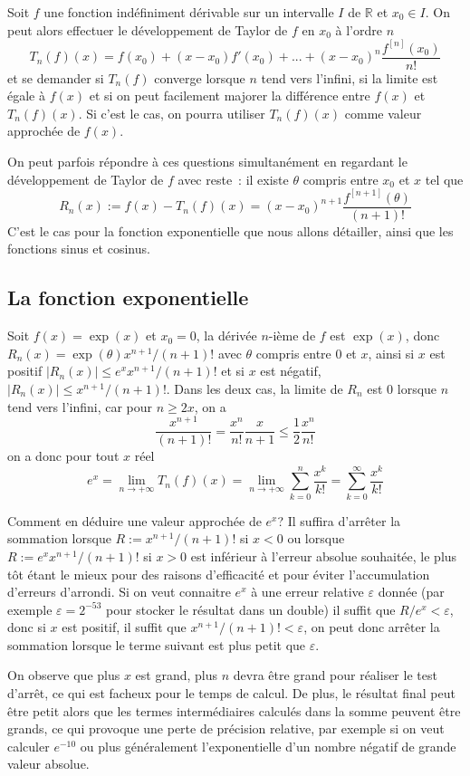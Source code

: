 \documentclass[a4paper,11pt]{article}
\newcommand{\R}{{\mathbb{R}}}
\begin{document}
\begin{giacjshere}
Soit $f$ une fonction indéfiniment dérivable sur un intervalle $I$ de $\R$
et $x_0 \in I$. On peut alors effectuer le développement de Taylor de $f$
en $x_0$ à l'ordre $n$
\[ T_n(f)(x)= f(x_0) + (x-x_0) f'(x_0) + ... + 
(x-x_0)^n \frac{f^{[n]}(x_0)}{n!} \]
et se demander si $T_n(f)$ converge lorsque $n$ tend vers
l'infini, si la limite est égale à $f(x)$ et si on peut facilement
majorer la différence entre $f(x)$ et $T_n(f)(x)$. Si c'est le
cas, on pourra utiliser $T_n(f)(x)$ comme valeur approchée de $f(x)$.

On peut parfois répondre à ces questions simultanément en regardant le
développement de Taylor de $f$ avec reste~: il existe $\theta$ compris
entre $x_0$ et $x$ tel que
\[ R_n(x) := f(x)- T_n(f)(x) = (x-x_0)^{n+1}\frac{f^{[n+1]}(\theta)}{(n+1)!} \]
C'est le cas pour la fonction exponentielle que nous allons
détailler, ainsi que les fonctions sinus et cosinus.

\subsection{La fonction exponentielle}
Soit $f(x)=\exp(x)$ et $x_0=0$, la dérivée $n$-ième de $f$ 
est $\exp(x)$, donc $R_n(x)=\exp(\theta)x^{n+1}/(n+1)!$ avec $\theta$
compris entre 0 et $x$, ainsi si $x$ est positif 
$|R_n(x)| \leq e^x x^{n+1}/(n+1)!$ et si $x$ est négatif,
$|R_n(x)| \leq x^{n+1}/(n+1)!$. Dans les deux cas, la limite de $R_n$
est 0 lorsque $n$ tend vers l'infini, car pour $n \geq 2x$, on a
\[ \frac{x^{n+1}}{(n+1)!} = \frac{x^n}{n!} \frac{x}{n+1}\leq 
\frac{1}{2}\frac{x^n}{n!}\]
on a donc pour tout $x$ réel
\[ e^x = \lim_{n \rightarrow +\infty} T_n(f)(x)
= \lim_{n \rightarrow +\infty} \sum_{k=0}^n \frac{x^k}{k!}
= \sum_{k=0}^\infty \frac{x^k}{k!} \]

Comment en déduire une valeur approchée de $e^x$? Il suffira d'arr\^eter
la sommation lorsque $R:=x^{n+1}/(n+1)!$ si $x<0$ ou lorsque
$R:=e^x x^{n+1}/(n+1)!$ si $x>0$ est inférieur à 
l'erreur absolue souhaitée, le plus tôt étant le mieux pour des
raisons d'efficacité et pour éviter l'accumulation d'erreurs
d'arrondi. 
Si on veut connaitre $e^x$ à une erreur relative $\varepsilon$ donnée
(par exemple $\varepsilon=2^{-53}$ pour stocker le résultat dans un double)
il suffit que $R/e^x < \varepsilon$, donc si $x$ est positif, il suffit
que $x^{n+1}/(n+1)!<\varepsilon$, on peut donc arrêter la sommation
lorsque le terme suivant est plus petit que $\varepsilon$.

On observe que plus $x$ est grand, plus $n$ devra
être grand pour réaliser le test d'arrêt, ce qui est facheux
pour le temps de calcul.
De plus, le résultat final peut être petit alors que les termes
intermédiaires calculés dans la somme peuvent être grands, ce qui
provoque une perte de précision relative, par exemple si on
veut calculer $e^{-10}$ ou plus généralement l'exponentielle
d'un nombre négatif de grande valeur absolue.


\end{giacjshere}
\end{document}
